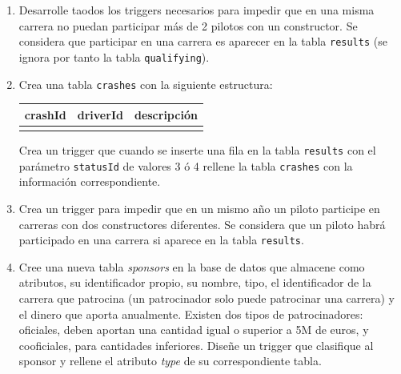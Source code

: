 \documentclass{db-practice}
\begin{document}
\begin{enumerate}
    
    \item Desarrolle taodos los triggers necesarios para impedir que en una misma carrera no puedan participar más de 2 pilotos con un constructor. Se considera que participar en una carrera es aparecer en la tabla \texttt{results} (se ignora por tanto la tabla \texttt{qualifying}).
        
    \item Crea una tabla \texttt{crashes} con la siguiente estructura:
    \begin{table}[H]
    \centering
    \begin{tabular}{@{}lll@{}}
    \toprule
    \multicolumn{1}{c}{\textbf{crashId}} & \multicolumn{1}{c}{\textbf{driverId}} & \multicolumn{1}{c}{\textbf{descripción}} \\ \midrule
                                         &                                       &                                          \\ \bottomrule
    \end{tabular}
    \end{table}

    Crea un trigger que cuando se inserte una fila en la tabla \texttt{results} con el parámetro \texttt{statusId} de valores 3 ó 4 rellene la tabla \texttt{crashes} con la información correspondiente.

    \item Crea un trigger para impedir que en un mismo año un piloto participe en carreras con dos constructores diferentes. Se considera que un piloto habrá participado en una carrera si aparece en la tabla \texttt{results}.
    
    \item Cree una nueva tabla \textit{sponsors} en la base de datos que almacene como atributos, su identificador propio, su nombre, tipo, el identificador de la carrera que patrocina (un patrocinador solo puede patrocinar una carrera) y el dinero que aporta anualmente. Existen dos tipos de patrocinadores: oficiales, deben aportan una cantidad igual o superior a 5M de euros, y cooficiales, para cantidades inferiores. Diseñe un trigger que clasifique al sponsor y rellene el atributo \textit{type} de su correspondiente tabla.
    
\end{enumerate}
\end{document}
